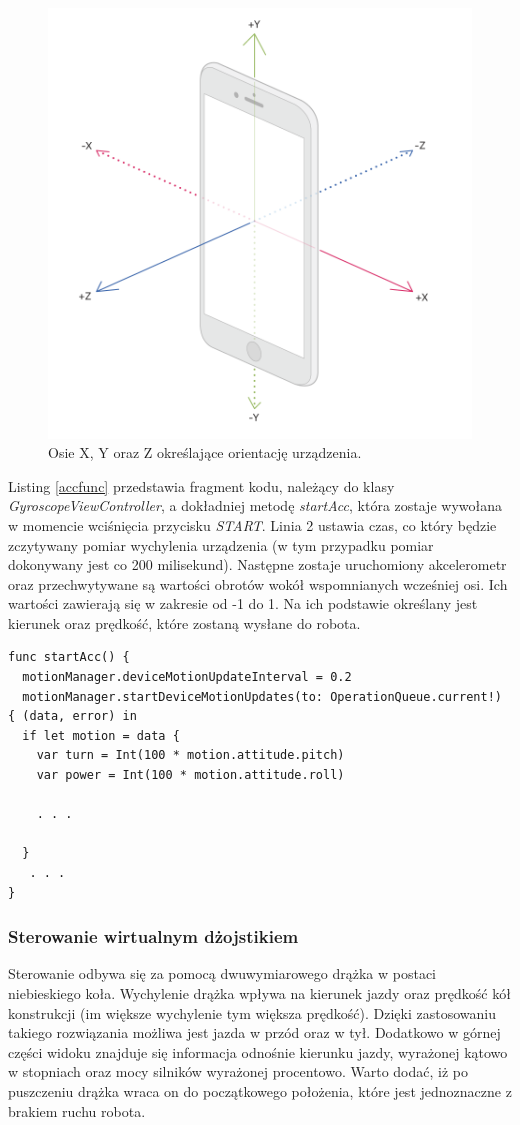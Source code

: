 \begin{figure}[H]
	\centering
		\includegraphics[width=0.6\linewidth]{pic05/axis}
	\caption{Osie X, Y oraz Z określające orientację urządzenia.}
	\label{fig:axis}	
\end{figure}

Listing \ref{accfunc} przedstawia fragment kodu, należący do klasy \textit{GyroscopeViewController}, a dokładniej metodę \textit{startAcc}, która zostaje wywołana w momencie wciśnięcia przycisku \textit{START}. Linia 2 ustawia czas, co który będzie zczytywany pomiar wychylenia urządzenia (w tym przypadku pomiar dokonywany jest co 200 milisekund). Następne zostaje uruchomiony akcelerometr oraz przechwytywane są wartości obrotów wokół wspomnianych wcześniej osi. Ich wartości zawierają się w zakresie od -1 do 1. Na ich podstawie określany jest kierunek oraz prędkość, które zostaną wysłane do robota.

\begin{minipage}{\textwidth}
	\begin{lstlisting}[label=accfunc,caption=Implementacja metody startAcc.]
func startAcc() {
  motionManager.deviceMotionUpdateInterval = 0.2
  motionManager.startDeviceMotionUpdates(to: OperationQueue.current!) { (data, error) in
  if let motion = data {
    var turn = Int(100 * motion.attitude.pitch)
    var power = Int(100 * motion.attitude.roll)
    
    . . . 

  }
   . . . 
}
	\end{lstlisting}
\end{minipage}

\subsubsection{Sterowanie wirtualnym dżojstikiem}
Sterowanie odbywa się za pomocą dwuwymiarowego drążka w postaci niebieskiego koła. Wychylenie drążka wpływa na kierunek jazdy oraz prędkość kół konstrukcji (im większe wychylenie tym większa prędkość). Dzięki zastosowaniu takiego rozwiązania możliwa jest jazda w przód oraz w tył. Dodatkowo w górnej części widoku znajduje się informacja odnośnie kierunku jazdy, wyrażonej kątowo w stopniach oraz mocy silników wyrażonej procentowo. Warto dodać, iż po puszczeniu drążka wraca on do początkowego położenia, które jest jednoznaczne z brakiem ruchu robota.

